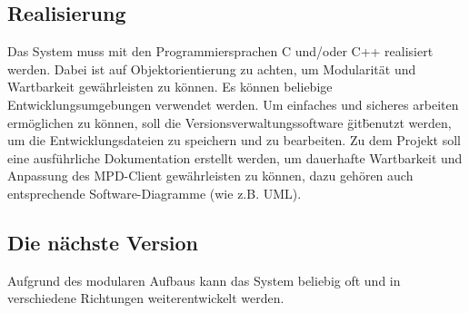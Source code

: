 \subsection{Realisierung}
Das System muss mit den Programmiersprachen C und/oder C++ realisiert werden. Dabei ist auf
Objektorientierung zu achten, um Modularität und Wartbarkeit gewährleisten zu können.
Es können beliebige Entwicklungsumgebungen verwendet werden. Um einfaches und sicheres arbeiten
ermöglichen zu können, soll die Versionsverwaltungssoftware \"git\" benutzt werden, um die
Entwicklungsdateien zu speichern und zu bearbeiten. Zu dem Projekt soll eine ausführliche
Dokumentation erstellt werden, um dauerhafte Wartbarkeit und Anpassung des MPD-Client  gewährleisten
zu können, dazu gehören auch entsprechende Software-Diagramme (wie z.B. UML).
\subsection{Die nächste Version}
Aufgrund des modularen Aufbaus kann das System beliebig oft und in verschiedene Richtungen weiterentwickelt werden.
